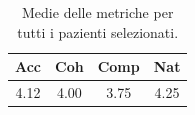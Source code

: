 
\begin{table}[!h]
\centering
\begin{tabular}{||c c c c||}
\hline
Acc & Coh & Comp & Nat \\ [0.5ex]
\hline\hline
4.12 & 4.00 & 3.75 & 4.25 \\
\hline
\end{tabular}
\caption{Medie delle metriche per tutti i pazienti selezionati.}
\label{tab:metriche_finali_pazienti}
\end{table}
